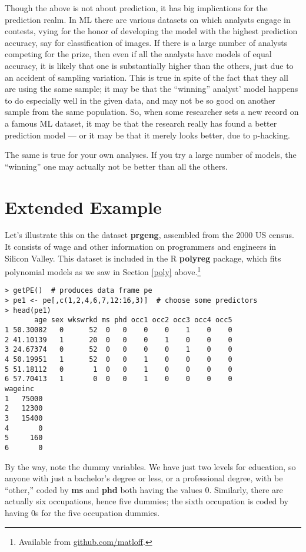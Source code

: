 Though the above is not about prediction, it has big implications for
the prediction realm.  In ML there are various datasets on which
analysts engage in contests, vying for the honor of developing the model
with the highest prediction accuracy, say for classification of images.
If there is a large number of analysts competing for the prize, then
even if all the analysts have models of equal accuracy, it is likely
that one is substantially higher than the others, just due to an
accident of sampling variation.  This is true in spite of the fact that
they all are using the same sample; it may be that the ``winning''
analyst' model happens to do especially well in the given data, and may
not be so good on another sample from the same population.  So, when some
researcher sets a new record on a famous ML dataset, it may be that the
research really has found a better prediction model --- or it may be
that it merely looks better, due to p-hacking.

The same is true for your own analyses.  If you try a large number of
models, the ``winning'' one may actually not be better than all the
others.

\section{Extended Example}
\label{prgengex}

Let's illustrate this on the dataset \textbf{prgeng}, assembled from the
2000 US census.  It consists of wage and other information on programmers and
engineers in Silicon Valley.  This dataset is included in the R
\textbf{polyreg} package, which fits polynomial models as we saw in
Section \ref{poly} above.\footnote{Available from
\url{github.com/matloff}.}

\begin{lstlisting}
> getPE()  # produces data frame pe
> pe1 <- pe[,c(1,2,4,6,7,12:16,3)]  # choose some predictors
> head(pe1)
       age sex wkswrkd ms phd occ1 occ2 occ3 occ4 occ5
1 50.30082   0      52  0   0    0    0    1    0    0
2 41.10139   1      20  0   0    0    1    0    0    0
3 24.67374   0      52  0   0    0    0    1    0    0
4 50.19951   1      52  0   0    1    0    0    0    0
5 51.18112   0       1  0   0    1    0    0    0    0
6 57.70413   1       0  0   0    1    0    0    0    0
wageinc
1   75000
2   12300
3   15400
4       0
5     160
6       0
\end{lstlisting}

By the way, note the dummy variables.  We have just two levels for
education, so anyone with just a bachelor's degree or less, or a
professional degree, with be ``other,'' coded by \textbf{ms} and
\textbf{phd} both having the values 0.  Similarly, there are actually
six occupations, hence five dummies; the sixth occupation is coded by
having 0s for the five occupation dummies.

